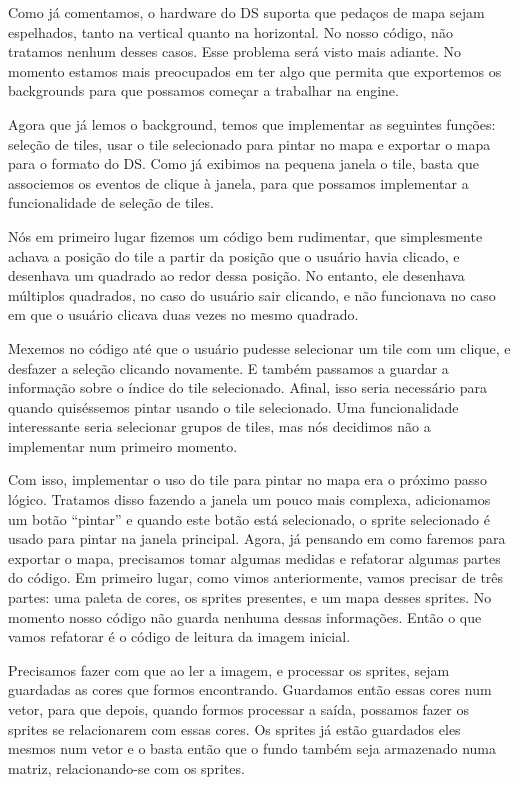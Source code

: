 \documentclass[brazil]{abnt}
\begin{document}
Como já comentamos, o hardware do DS suporta que pedaços de mapa sejam espelhados, tanto na vertical quanto na horizontal. No nosso código, não tratamos nenhum desses casos. Esse problema será visto mais adiante. No momento estamos mais preocupados em ter algo que permita que exportemos os backgrounds para que possamos começar a trabalhar na engine.

Agora que já lemos o background, temos que implementar as seguintes funções: seleção de tiles, usar o tile selecionado para pintar no mapa e exportar o mapa para o formato do DS. Como já exibimos na pequena janela o tile, basta que associemos os eventos de clique à janela, para que possamos implementar a funcionalidade de seleção de tiles.

Nós em primeiro lugar fizemos um código bem rudimentar, que simplesmente achava a posição do tile a partir da posição que o usuário havia clicado, e desenhava um quadrado ao redor dessa posição. No entanto, ele desenhava múltiplos quadrados, no caso do usuário sair clicando, e não funcionava no caso em que o usuário clicava duas vezes no mesmo quadrado.

Mexemos no código até que o usuário pudesse selecionar um tile com um clique, e desfazer a seleção clicando novamente. E também passamos a guardar a informação sobre o índice do tile selecionado. Afinal, isso seria necessário para quando quiséssemos pintar usando o tile selecionado. Uma funcionalidade interessante seria selecionar grupos de tiles, mas nós decidimos não a implementar num primeiro momento.

Com isso, implementar o uso do tile para pintar no mapa era o próximo passo lógico. Tratamos disso fazendo a janela um pouco mais complexa, adicionamos um botão ``pintar'' e quando este botão está selecionado, o sprite selecionado é usado para pintar na janela principal. Agora, já pensando em como faremos para exportar o mapa, precisamos tomar algumas medidas e refatorar algumas partes do código. Em primeiro lugar, como vimos anteriormente, vamos precisar de três partes: uma paleta de cores, os sprites presentes, e um mapa desses sprites. No momento nosso código não guarda nenhuma dessas informações. Então o que vamos refatorar é o código de leitura da imagem inicial.

Precisamos fazer com que ao ler a imagem, e processar os sprites, sejam guardadas as cores que formos encontrando. Guardamos então essas cores num vetor, para que depois, quando formos processar a saída, possamos fazer os sprites se relacionarem com essas cores. Os sprites já estão guardados eles mesmos num vetor e o basta então que o fundo também seja armazenado numa matriz, relacionando-se com os sprites.
\end{document}
